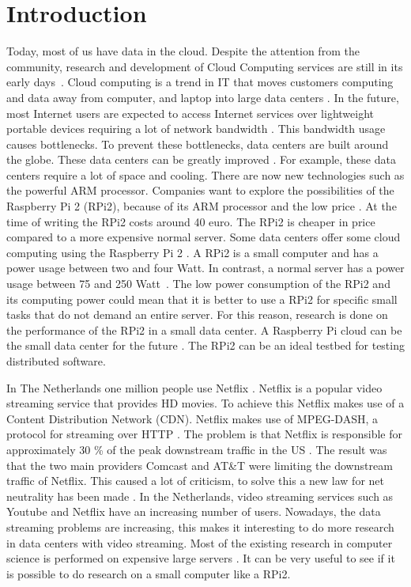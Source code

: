 \documentclass{sig-alternate-br}
\begin{document}
\section{Introduction}
Today, most of us have data in the cloud. Despite the attention from the community, research and development of Cloud Computing services are still in its early days~\citep{tso:2013}. \newline
Cloud computing is a trend in IT that moves customers computing and data away from computer, and laptop into large data centers \citep{dikaiakos:2009}. In the future, most Internet users are expected to access Internet services over lightweight portable devices requiring a lot of network bandwidth \cite{dikaiakos:2009}. This bandwidth usage causes bottlenecks. To prevent these bottlenecks, data centers are built around the globe. These data centers can be greatly improved \cite{abrahamsson:2013,beloglazov:2010}. 
For example, these data centers require a lot of space and cooling. There are now new technologies such as the powerful ARM processor. Companies want to explore the possibilities of the Raspberry Pi 2 (RPi2), because of its ARM processor and the low price \cite{Pcextreme}. At the time of writing the RPi2 costs around 40 euro. The RPi2 is cheaper in price compared to a more expensive normal server. Some data centers offer some cloud computing using the Raspberry Pi 2 \cite{Pcextreme}. \newline
A RPi2 is a small computer and has a power usage between two and four Watt. In contrast, a normal server has a power usage between 75 and 250 Watt~\cite{Pcextreme,beloglazov2012energy}. The low power consumption of the RPi2 and its computing power could mean that it is better to use a RPi2 for specific small tasks that do not demand an entire server. For this reason, research is done on the performance of the RPi2 in a small data center. \newline
A Raspberry Pi cloud can be the small data center for the future \cite{tso:2013}. The RPi2 can be an ideal testbed for testing distributed software. 

In The Netherlands one million people use Netflix \cite{volkskrant}. Netflix is a popular video streaming service that provides HD movies. To achieve this Netflix makes use of a Content Distribution Network (CDN). Netflix makes use of MPEG-DASH, a protocol for streaming over HTTP \cite{martin:2013}. The problem is that Netflix is responsible for approximately 30 \% of the peak downstream traffic in the US \cite{Adhikari:2012}. The result was that the two main providers Comcast and  AT\&T were limiting the downstream traffic of Netflix. This caused a lot of criticism, to solve this a new law for net neutrality has been made \cite{net-neutrality}. \newline
In the Netherlands, video streaming services such as Youtube and Netflix have an increasing number of users. Nowadays, the data streaming problems are increasing, this makes it interesting to do more research in data centers with video streaming. Most of the existing research in computer science is performed on expensive large servers \cite{tso:2013}. It can be very useful to see if it is possible to do research on a small computer like a RPi2.
\end{document}
